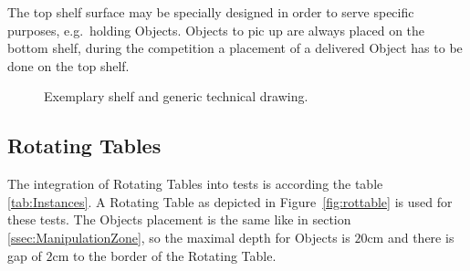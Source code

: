 The top shelf surface may be specially designed in order to serve specific purposes, e.g.\, holding Objects. Objects to pic up are always placed on the bottom shelf, during the competition a placement of a delivered Object has to be done on the top shelf.  

\begin{figure}[h!]
	\centering
	\hspace{0.05\textwidth}
	\caption{Exemplary shelf and generic technical drawing.}%
	\label{fig:shelf}
\end{figure}


\subsection{Rotating Tables}\label{sec:Rotating Table}
The integration of Rotating Tables into tests is according the table \ref{tab:Instances}.  A Rotating Table as depicted in Figure~\ref{fig:rottable} is used for these tests. The Objects placement is the same like in section \ref{ssec:ManipulationZone}, so the maximal depth for Objects is $20 \si{\centi\meter}$ and there is gap of $2\si{\centi\meter}$ to the border of the Rotating Table.


